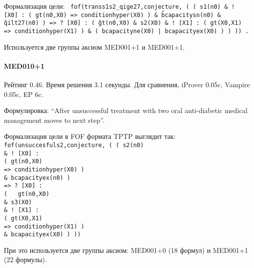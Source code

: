 Формализация цели:
\texttt{
fof(transs1s2\_qige27,conjecture,
    ( ( s1(n0)
      \& ! [X0] :
          ( gt(n0,X0)
         => conditionhyper(X0) )
      \& \~ bcapacitysn(n0)
      \& \~ qilt27(n0) )
   => ? [X0] :
        ( \~ gt(n0,X0)
        \& s2(X0)
        \& ! [X1] :
            ( gt(X0,X1)
           => conditionhyper(X1) )
        \& ( bcapacityne(X0)
          | bcapacityex(X0) ) ) ))
.}

Используется две группы аксиом MED001+1 и MED001+1.

\paragraph{MED010+1}
Рейтинг 0.46. Время решения 3.1 секунды. Для сравнения, iProver 0.05c, Vampire 0.05c, EP 6c.

Формулировка: ``After unsuccessful treatment with two oral anti-diabetic medical management moves to next step''.

Формализация цели в FOF формата TPTP выглядит так:
\texttt{fof(unsuccesfuls2,conjecture,
    ( ( s2(n0)\\
      \& ! [X0] :\\
          ( gt(n0,X0)\\
         => conditionhyper(X0) )\\
      \& bcapacityex(n0) )\\
   => ? [X0] :\\
        ( ~ gt(n0,X0)\\
        \& s3(X0)\\
        \& ! [X1] :\\
            ( gt(X0,X1)\\
           => conditionhyper(X1) )\\
        \& bcapacityex(X0) ) ))\\}

При это используется две группы аксиом: MED001+0 (18 формул) и MED001+1 (22 формулы).








